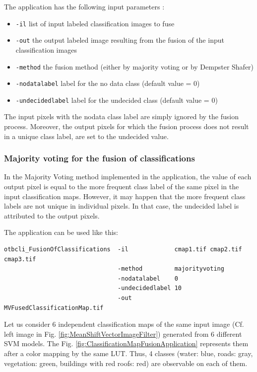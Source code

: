 The  application has the following input parameters :
\begin{itemize}
\item \verb?-il? list of input labeled classification images to fuse
\item \verb?-out? the output labeled image resulting from the fusion of the input classification images
\item \verb?-method? the fusion method (either by majority voting or by Dempster Shafer)
\item \verb?-nodatalabel? label for the no data class (default value = 0)
\item \verb?-undecidedlabel? label for the undecided class (default value = 0)
\end{itemize}


The input pixels with the nodata class label are simply ignored by the fusion process. 
Moreover, the output pixels for which the fusion process does not result in a unique 
class label, are set to the undecided value.

\subsubsection{Majority voting for the fusion of classifications}

In the Majority Voting method implemented in the  
application, the value of each output pixel is equal to the more frequent class 
label of the same pixel in the input classification maps. However, it may happen 
that the more frequent class labels are not unique in individual pixels. In that 
case, the undecided label is attributed to the output pixels.


The application can be used like this:
\begin{verbatim}
otbcli_FusionOfClassifications  -il             cmap1.tif cmap2.tif cmap3.tif
                                -method         majorityvoting
                                -nodatalabel    0
                                -undecidedlabel 10
                                -out            MVFusedClassificationMap.tif
\end{verbatim}


Let us consider 6 independent classification maps of the same input image (Cf. left 
image in Fig. \ref{fig:MeanShiftVectorImageFilter}) generated from 6 different SVM 
models. The Fig. \ref{fig:ClassificationMapFusionApplication} represents them after 
a color mapping by the same LUT. Thus, 4 classes (water: blue, roads: gray, 
vegetation: green, buildings with red roofs: red) are observable on each of them.


